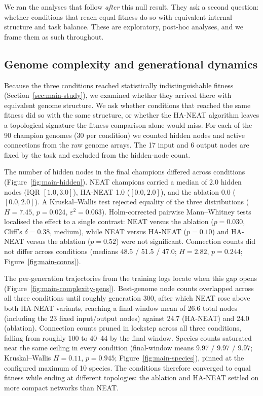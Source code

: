 \documentclass[12pt]{article}
\newcommand{\revBrit}[2]{#2}
\begin{document}
We ran the analyses that follow \emph{after} this null result.
They ask a second question: whether conditions that reach equal fitness do so with equivalent internal structure and task balance.
These are exploratory, post-hoc analyses, and we frame them as such throughout.

\subsection{Genome complexity and generational dynamics}
\label{sec:main-complexity}

Because the three conditions reached statistically indistinguishable fitness (Section~\ref{sec:main-study}), we examined whether they arrived there with equivalent genome structure.
We ask whether conditions that reached the same fitness did so with the same structure, or whether the HA-NEAT algorithm leaves a topological signature the fitness comparison alone would miss.
For each of the 90 champion genomes (30 per condition) we counted hidden nodes and active connections from the raw genome arrays.
The 17 input and 6 output nodes are fixed by the task and excluded from the hidden-node count.

The number of hidden nodes in the final champions differed across conditions (Figure~\ref{fig:main-hidden}).
NEAT champions carried a median of 2.0 hidden nodes (IQR $[1.0, 3.0]$), HA-NEAT 1.0 ($[0.0, 2.0]$), and the ablation 0.0 ($[0.0, 2.0]$). A Kruskal--Wallis test rejected equality of the three distributions ($H = 7.45$, $p = 0.024$, $\varepsilon^2 = 0.063$).
Holm-corrected pairwise Mann--Whitney tests \revBrit{E-10}{localised} the effect to a single contrast: NEAT versus the ablation ($p = 0.030$, Cliff's $\delta = 0.38$, medium), while NEAT versus HA-NEAT ($p = 0.10$) and HA-NEAT versus the ablation ($p = 0.52$) were not significant.
Connection counts did not differ across conditions (medians 48.5 / 51.5 / 47.0; $H = 2.82$, $p = 0.244$; Figure~\ref{fig:main-conns}).

The per-generation trajectories from the training logs locate when this gap opens (Figure~\ref{fig:main-complexity-gens}).
Best-genome node counts overlapped across all three conditions until roughly generation 300, after which NEAT rose above both HA-NEAT variants, reaching a final-window mean of 26.6 total nodes (including the 23 fixed input/output nodes) against 24.7 (HA-NEAT) and 24.0 (ablation).
Connection counts pruned in lockstep across all three conditions, falling from roughly 100 to 40--44 by the final window.
Species counts saturated near the same ceiling in every condition (final-window means 9.97 / 9.97 / 9.97; Kruskal--Wallis $H = 0.11$, $p = 0.945$; Figure~\ref{fig:main-species}), pinned at the configured maximum of 10 species.
The conditions therefore converged to equal fitness while ending at different topologies: the ablation and HA-NEAT settled on more compact networks than NEAT.
\end{document}
